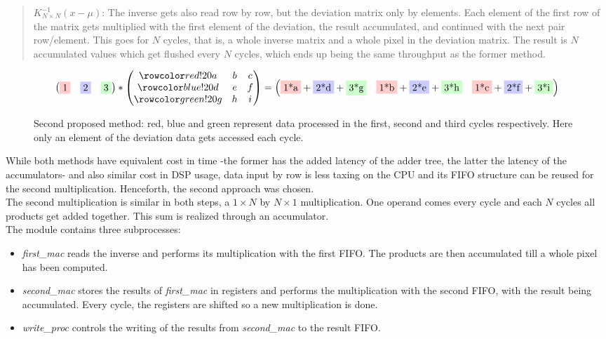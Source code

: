 \begin{quote}
	\(K^{-1}_{N \times N} (x-\mu)\):
	The inverse gets also read row by row, but the deviation matrix only by elements. Each element of the first row of the matrix gets multiplied with the first element of the deviation, the result accumulated, and continued with the next pair row/element. This goes for \(N\) cycles, that is, a whole inverse matrix and a whole pixel in the deviation matrix. The result is \(N\) accumulated values which get flushed every \(N\) cycles, which ends up being the same throughput as the former method.
\end{quote}

\begin{figure}[h]%
\[
\begin{pmatrix}
\rb1 & \bb 2 & \gb 3
\end{pmatrix}
*
\begin{pmatrix}
\rr a & b & c \\ 
\br d & e & f \\ 
\gr g & h & i
\end{pmatrix}
=
\begin{pmatrix}
\rb{1*a}+\bb{2*d}+\gb{3*g} & \rb{1*b}+\bb{2*e}+\gb{3*h} & \rb{1*c}+\bb{2*f}+\gb{3*i}
\end{pmatrix} 
\]
\caption[Optional: Short caption to appear in List of Figures]{Second proposed method: red, blue and green represent data processed in the first, second and third cycles respectively. Here only an element of the deviation data gets accessed each cycle.}
\end{figure}

While both methods have equivalent cost in time -the former has the added latency of the adder tree, the latter the latency of the accumulators- and also similar cost in DSP usage, data input by row is less taxing on the CPU and its FIFO structure can be reused for the second multiplication. Henceforth, the second approach was chosen.
\\

The second multiplication is similar in both steps, a \(1 \times N\) by \(N \times 1\) multiplication. One operand comes every cycle and each \(N\) cycles all products get added together. This sum is realized through an accumulator.\\

The module contains three subprocesses:
\begin{itemize}
	\item \emph{first\_mac} reads the inverse and performs its multiplication with the first FIFO. The products are then accumulated till a whole pixel has been computed.
	\item \emph{second\_mac} stores the results of \emph{first\_mac} in registers and performs the multiplication with the second FIFO, with the result being accumulated. Every cycle, the registers are shifted so a new multiplication is done.
	\item \emph{write\_proc} controls the writing of the results from \emph{second\_mac} to the result FIFO.
\end{itemize}



